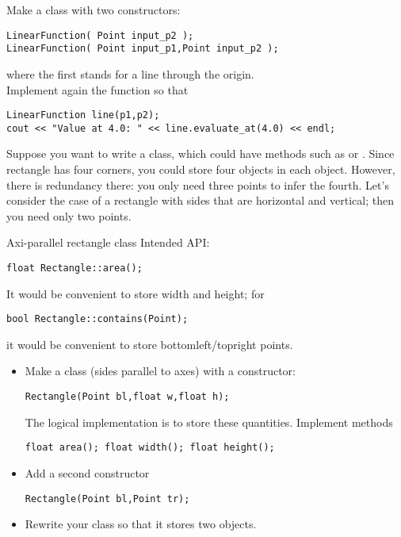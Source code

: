 \begin{exercise}
  \label{ex:geom:line2}
  Make a class  with two constructors:
\begin{verbatim}
LinearFunction( Point input_p2 );
LinearFunction( Point input_p1,Point input_p2 );
\end{verbatim}
where the first stands for a line through the origin.\\
Implement again the  function so that
\begin{verbatim}
LinearFunction line(p1,p2);
cout << "Value at 4.0: " << line.evaluate_at(4.0) << endl;
\end{verbatim}
\end{exercise}

Suppose you want to write a  class, which could have methods such as
 or .
Since rectangle has four corners, you could store four 
objects in each  object. However, there is redundancy
there: you only need three points to infer the fourth. Let's consider
the case of a rectangle with sides that are horizontal and vertical;
then you need only two points.

\begin{block}{Axi-parallel rectangle class}
  \label{ex:geom:rect}
  Intended API:
\begin{verbatim}
float Rectangle::area();
\end{verbatim}
It would be convenient to store width and height; for 
\begin{verbatim}
bool Rectangle::contains(Point);  
\end{verbatim}
it would be convenient to store bottomleft/topright points.
\end{block}

\begin{exercise}
  \label{ex:geom:rect2}
  \begin{itemize}
  \item
    Make a class  (sides parallel to axes) with a constructor:
\begin{verbatim}
Rectangle(Point bl,float w,float h);
\end{verbatim}
The logical implementation is to store these quantities.
Implement methods
\begin{verbatim}
float area(); float width(); float height();
\end{verbatim}
\item Add a second constructor
\begin{verbatim}
Rectangle(Point bl,Point tr);
\end{verbatim}
\item Rewrite your class so that it stores two  objects.
\end{itemize}
\end{exercise}


